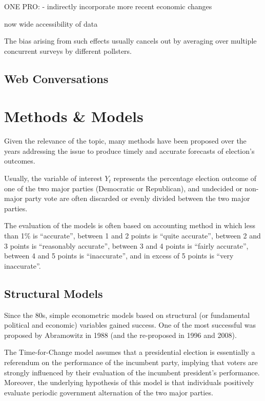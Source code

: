 \documentclass[
  12pt]{article}
\begin{document}
ONE PRO: - indirectly incorporate more recent economic changes

now wide accessibility of data

The bias arising from such effects usually cancels out by averaging over
multiple concurrent surveys by different pollsters.

\hypertarget{web-conversations}{%
\subsection{Web Conversations}\label{web-conversations}}

\hypertarget{methods-models}{%
\section{Methods \& Models}\label{methods-models}}

Given the relevance of the topic, many methods have been proposed over
the years addressing the issue to produce timely and accurate forecasts
of election's outcomes.

Usually, the variable of interest \(Y_t\) represents the percentage
election outcome of one of the two major parties (Democratic or
Republican), and undecided or non-major party vote are often discarded
or evenly divided between the two major parties.

The evaluation of the models is often based on \citet{cam:1996}
accounting method in which less than 1\% is ``accurate'', between 1 and
2 points is ``quite accurate'', between 2 and 3 points is ``reasonably
accurate'', between 3 and 4 points is ``fairly accurate'', between 4 and
5 points is ``inaccurate'', and in excess of 5 points is ``very
inaccurate''.

\hypertarget{structural-models}{%
\subsection{Structural Models}\label{structural-models}}

Since the 80s, simple econometric models based on structural (or
fundamental political and economic) variables gained success. One of the
most successful was proposed by Abramowitz in 1988 (and the re-proposed
in 1996 and 2008).

The Time-for-Change model \citep{abr:2008} assumes that a presidential
election is essentially a referendum on the performance of the incumbent
party, implying that voters are strongly influenced by their evaluation
of the incumbent president's performance. Moreover, the underlying
hypothesis of this model is that individuals positively evaluate
periodic government alternation of the two major parties.
\end{document}
